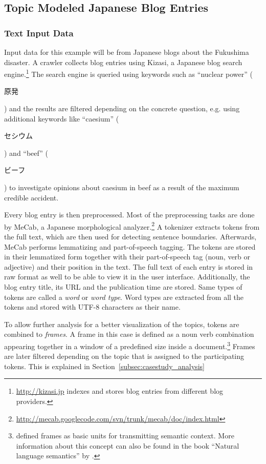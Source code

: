 \subsection{Topic Modeled Japanese Blog Entries}

\subsubsection{Text Input Data}

Input data for this example will be from Japanese blogs about the Fukushima disaster. A crawler collects blog entries using Kizasi, a Japanese blog search engine.\footnote{\url{http://kizasi.jp} indexes and stores blog entries from different blog providers.} The search engine is queried using keywords such as ``nuclear power'' (\begin{CJK}{UTF8}{}原発\end{CJK}) and the results are filtered depending on the concrete question, e.g. using additional keywords like ``caesium'' (\begin{CJK}{UTF8}{}セシウム\end{CJK}) and ``beef'' (\begin{CJK}{UTF8}{}ビーフ\end{CJK}) to investigate opinions about caesium in beef as a result of the maximum credible accident.

Every blog entry is then preprocessed. Most of the preprocessing tasks are done by MeCab, a Japanese morphological analyzer.\footnote{\url{http://mecab.googlecode.com/svn/trunk/mecab/doc/index.html}} A tokenizer extracts tokens from the full text, which are then used for detecting sentence boundaries. Afterwards, MeCab performs lemmatizing and part-of-speech tagging. The tokens are stored in their lemmatized form together with their part-of-speech tag (noun, verb or adjective) and their position in the text. The full text of each entry is stored in raw format as well to be able to view it in the user interface. Additionally, the blog entry title, its URL and the publication time are stored. Same types of tokens are called a \emph{word} or \emph{word type}. Word types are extracted from all the tokens and stored with UTF-8 characters as their name.

To allow further analysis for a better visualization of the topics, tokens are combined to \emph{frames}. A frame in this case is defined as a noun verb combination appearing together in a window of a predefined size inside a document.\footnote{\textcite{minsky1977frame} defined frames as basic units for transmitting semantic context. More information about this concept can also be found in the book ``Natural language semantics'' by \textcite{allan2001natural}.} Frames are later filtered depending on the topic that is assigned to the participating tokens. This is explained in Section~\ref{subsec:casestudy_analysis}

